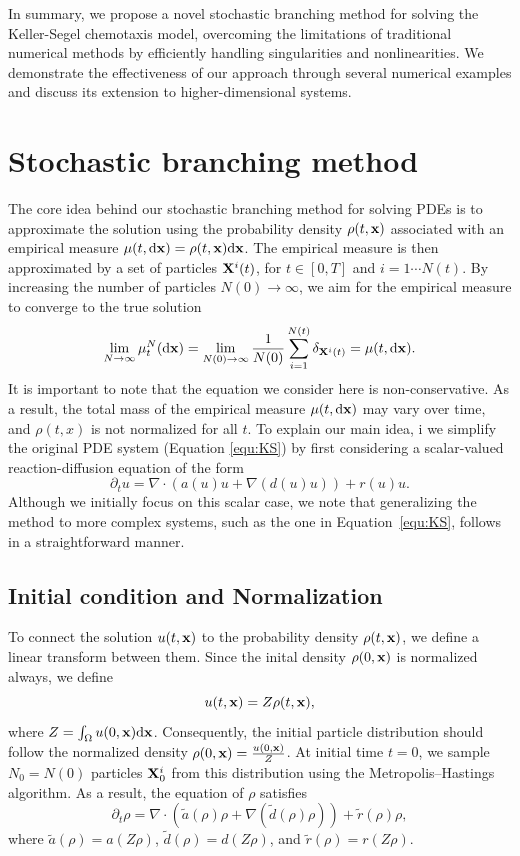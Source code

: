 \documentclass[12pt]{article}
\begin{document}
In summary, we propose a novel stochastic branching method for solving the Keller-Segel chemotaxis model, overcoming the limitations of traditional numerical methods by efficiently handling singularities and nonlinearities. We demonstrate the effectiveness of our approach through several numerical examples and discuss its extension to higher-dimensional systems.



\section{Stochastic branching method}
The core idea behind our stochastic branching method for solving PDEs is to approximate the solution using the probability density $\rho (t, \mathbf{x})$ associated with an empirical measure $\mu(t, \mathrm{d} \mathbf{x}) = \rho (t, \mathbf{x})\mathrm{d} \mathbf{x}$. The empirical measure is then approximated by a set of particles $\mathbf{X}^i(t)$, for $t\in[0,T]$ and $i=1\cdots N(t)$. By increasing the number of particles $N(0)\to \infty$, we aim for the empirical measure to converge to the true solution   
\[\lim_{N\to \infty} \mu^N_t(\mathrm{d} \mathbf{x}) = \lim_{N(0)\to \infty} \frac{1}{N(0)}\sum_{i=1}^{N(t)} \delta_{\mathbf{X}^i(t)}=\mu(t,\mathrm{d} \mathbf{x}).
\]  
It is important to note that the equation we consider here is non-conservative. As a result, the total mass of the empirical measure $\mu(t,\mathrm{d} \mathbf{x})$ may vary over time, and $\rho(t,x)$ is not normalized for all $t$. To explain our main idea, i we simplify the original PDE system (Equation \eqref{equ:KS}) by first considering a scalar-valued reaction-diffusion equation of the form
\begin{equation}\label{equ:reaction-diffusion}
\partial_t u = \nabla \cdot \left( a(u)u + \nabla (d(u) u) \right) + r(u)u.
\end{equation}
Although we initially focus on this scalar case, we note that generalizing the method to more complex systems, such as the one in Equation~\eqref{equ:KS}, follows in a straightforward manner.
\subsection{Initial condition and Normalization}
To connect the solution $u(t,\mathbf{x})$ to the probability density $\rho(t,\mathbf{x})$, we define a linear transform between them. Since the inital density $\rho(0,\mathbf{x})$ is normalized always, we define 
\begin{equation}
    u(t,\mathbf{x}) = Z \rho(t,\mathbf{x}),
\end{equation}
where $Z = \int_{\Omega} u(0,\mathbf{x})\mathrm{d} \mathbf{x}$. 
Consequently, the initial particle distribution should follow the normalized density $\rho(0,\mathbf{x})= \frac{u(0,\mathbf{x})}{Z}$. At initial time $t=0$, we sample $N_0=N(0)$ particles $\mathbf{X}_0^i$ from this distribution using the Metropolis–Hastings algorithm. As a result, the equation of $\rho$ satisfies 
\begin{equation}\label{equ:normalized_diffusion_reaction}
\partial_t \rho = \nabla \cdot \left( \tilde a(\rho)\rho + \nabla (\tilde 
 d(\rho) \rho )\right) + \tilde r(\rho)\rho,
\end{equation}
 where $\tilde a(\rho)  = a(Z\rho)$, $\tilde d(\rho)  = d(Z\rho)$, and $\tilde r(\rho)  = r(Z\rho)$. 
\end{document}
